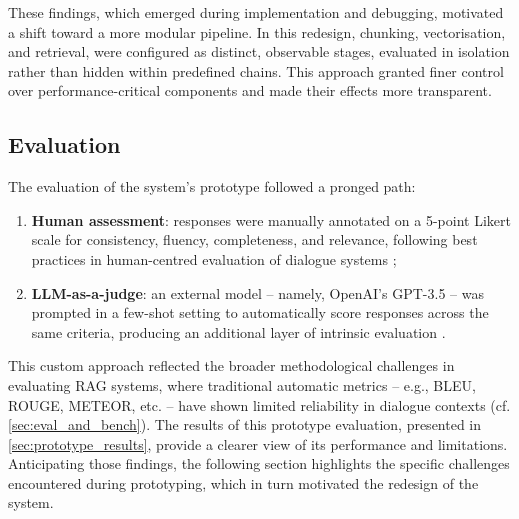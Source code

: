 \begin{spacing}{1.5}
These findings, which emerged during implementation and debugging, motivated a shift toward a more modular pipeline. In this redesign, chunking, vectorisation, and retrieval, were configured as distinct, observable stages, evaluated in isolation rather than hidden within predefined chains. This approach granted finer control over performance-critical components and made their effects more transparent.

\subsection{Evaluation}
The evaluation of the system's prototype followed a pronged path:
\begin{enumerate}
      \item \textbf{Human assessment}: responses were manually annotated on a 5-point Likert scale for consistency, fluency, completeness, and relevance, following best practices in human-centred evaluation of dialogue systems \citep{abeysinghe_challenges_2024,van_der_lee_human_2021};
      \item \textbf{LLM-as-a-judge}: an external model -- namely, OpenAI’s GPT-3.5 -- was prompted in a few-shot setting to automatically score responses across the same criteria, producing an additional layer of intrinsic evaluation \citep{svikhnushina_approximating_2023}.
\end{enumerate}

This custom approach reflected the broader methodological challenges in evaluating RAG systems, where traditional automatic metrics -- e.g., BLEU, ROUGE, METEOR, etc. -- have shown limited reliability in dialogue contexts (cf. \autoref{sec:eval_and_bench}). The results of this prototype evaluation, presented in \autoref{sec:prototype_results}, provide a clearer view of its performance and limitations. Anticipating those findings, the following section highlights the specific challenges encountered during prototyping, which in turn motivated the redesign of the system.


\end{spacing}
